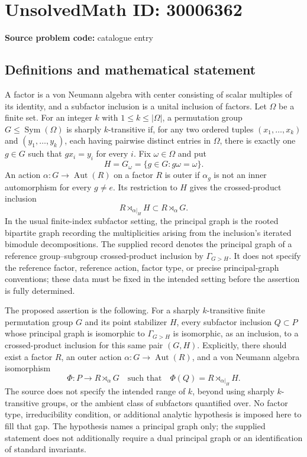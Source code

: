 \documentclass[11pt]{article}
\begin{document}
\section*{UnsolvedMath ID: 30006362}
\textbf{Source problem code:} catalogue entry
\subsection{Definitions and mathematical statement}
A factor is a von Neumann algebra with center consisting of scalar multiples of its identity, and a subfactor inclusion is a unital inclusion of factors. Let \(\Omega\) be a finite set. For an integer \(k\) with \(1\leq k\leq |\Omega|\), a permutation group \(G\leq\operatorname{Sym}(\Omega)\) is sharply \(k\)-transitive if, for any two ordered tuples \((x_1,\ldots,x_k)\) and \((y_1,\ldots,y_k)\), each having pairwise distinct entries in \(\Omega\), there is exactly one \(g\in G\) such that \(g x_i=y_i\) for every \(i\). Fix \(\omega\in\Omega\) and put
\[
H=G_\omega=\{g\in G:g\omega=\omega\}.
\]
An action \(\alpha:G\to\operatorname{Aut}(R)\) on a factor \(R\) is outer if \(\alpha_g\) is not an inner automorphism for every \(g\neq e\). Its restriction to \(H\) gives the crossed-product inclusion
\[
R\rtimes_{\alpha|_H}H\subset R\rtimes_\alpha G.
\]
In the usual finite-index subfactor setting, the principal graph is the rooted bipartite graph recording the multiplicities arising from the inclusion's iterated bimodule decompositions. The supplied record denotes the principal graph of a reference group--subgroup crossed-product inclusion by \(\Gamma_{G>H}\). It does not specify the reference factor, reference action, factor type, or precise principal-graph conventions; these data must be fixed in the intended setting before the assertion is fully determined.

The proposed assertion is the following. For a sharply \(k\)-transitive finite permutation group \(G\) and its point stabilizer \(H\), every subfactor inclusion \(Q\subset P\) whose principal graph is isomorphic to \(\Gamma_{G>H}\) is isomorphic, as an inclusion, to a crossed-product inclusion for this same pair \((G,H)\). Explicitly, there should exist a factor \(R\), an outer action \(\alpha:G\to\operatorname{Aut}(R)\), and a von Neumann algebra isomorphism
\[
\Phi:P\longrightarrow R\rtimes_\alpha G
\quad\text{such that}\quad
\Phi(Q)=R\rtimes_{\alpha|_H}H.
\]
The source does not specify the intended range of \(k\), beyond using sharply \(k\)-transitive groups, or the ambient class of subfactors quantified over. No factor type, irreducibility condition, or additional analytic hypothesis is imposed here to fill that gap. The hypothesis names a principal graph only; the supplied statement does not additionally require a dual principal graph or an identification of standard invariants.
\end{document}
